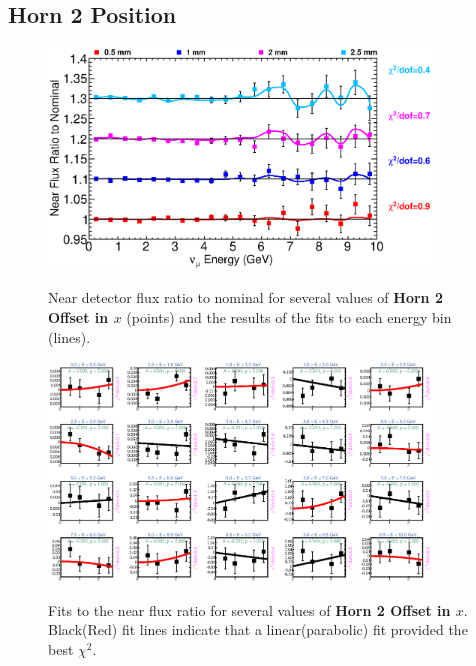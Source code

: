 \clearpage
\subsection{Horn 2 Position}

\begin{figure}[ht]
  \begin{center}
    {\includegraphics[width=4.0in]{figures/Horn2XOffset_near_summary.eps}}
  \end{center}
\caption{ Near detector flux ratio to nominal for several values of {\bf Horn 2 Offset in $x$} (points) and the results of the fits to each energy bin (lines).}
\end{figure}

\begin{figure}[hb]
  \begin{center}
    {\includegraphics[width=4.0in]{figures/Horn2XOffset_near_fits.eps}}
  \end{center}
\caption{ Fits to the near flux ratio for several values of {\bf Horn 2 Offset in $x$}. Black(Red) fit lines indicate that a linear(parabolic) fit provided the best $\chi^2$. }
\end{figure}

